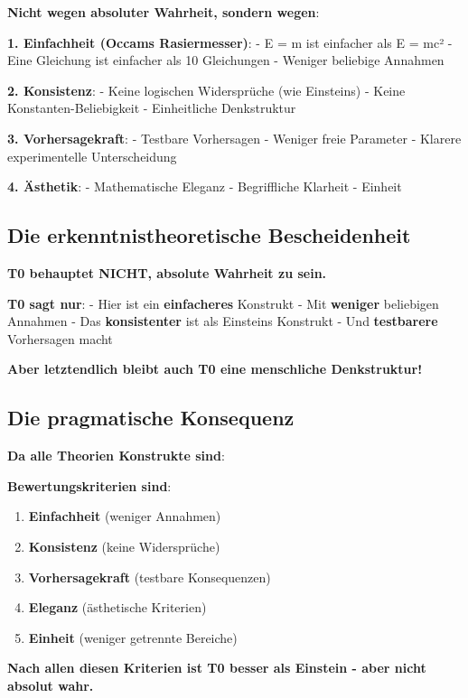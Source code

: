 \documentclass[12pt,a4paper]{article}
\begin{document}
	\textbf{Nicht wegen absoluter Wahrheit, sondern wegen}:
	
	\textbf{1. Einfachheit (Occams Rasiermesser)}:
	- E = m ist einfacher als E = mc²
	- Eine Gleichung ist einfacher als 10 Gleichungen
	- Weniger beliebige Annahmen
	
	\textbf{2. Konsistenz}:
	- Keine logischen Widersprüche (wie Einsteins)
	- Keine Konstanten-Beliebigkeit
	- Einheitliche Denkstruktur
	
	\textbf{3. Vorhersagekraft}:
	- Testbare Vorhersagen
	- Weniger freie Parameter
	- Klarere experimentelle Unterscheidung
	
	\textbf{4. Ästhetik}:
	- Mathematische Eleganz
	- Begriffliche Klarheit
	- Einheit
	
	\subsection{Die erkenntnistheoretische Bescheidenheit}
	
	\textbf{T0 behauptet NICHT, absolute Wahrheit zu sein.}
	
	\textbf{T0 sagt nur}:
	- Hier ist ein \textbf{einfacheres} Konstrukt
	- Mit \textbf{weniger} beliebigen Annahmen
	- Das \textbf{konsistenter} ist als Einsteins Konstrukt
	- Und \textbf{testbarere} Vorhersagen macht
	
	\textbf{Aber letztendlich bleibt auch T0 eine menschliche Denkstruktur!}
	
	\subsection{Die pragmatische Konsequenz}
	
	\textbf{Da alle Theorien Konstrukte sind}:
	
	\textbf{Bewertungskriterien sind}:
	\begin{enumerate}
		\item \textbf{Einfachheit} (weniger Annahmen)
		\item \textbf{Konsistenz} (keine Widersprüche)
		\item \textbf{Vorhersagekraft} (testbare Konsequenzen)
		\item \textbf{Eleganz} (ästhetische Kriterien)
		\item \textbf{Einheit} (weniger getrennte Bereiche)
	\end{enumerate}
	
	\textbf{Nach allen diesen Kriterien ist T0 besser als Einstein - aber nicht absolut wahr.}
	
\end{document}

